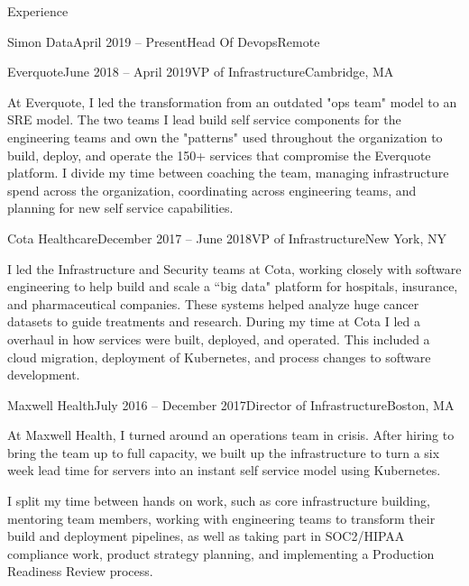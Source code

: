 \documentclass{resume} %
\begin{document}
\begin{rSection}{Experience}
\begin{rSubsection}{Simon Data}{April 2019 -- Present}{Head Of Devops}{Remote}
\end{rSubsection}

\begin{rSubsection}{Everquote}{June 2018 -- April 2019}{VP of Infrastructure}{Cambridge, MA}

\item[] At Everquote, I led the transformation from an outdated "ops team" model to an
  SRE model.  The two teams I lead build self service components for the engineering
  teams and own the "patterns" used throughout the organization to build, deploy, and
  operate the 150+ services that compromise the Everquote platform.  I divide my time
  between coaching the team, managing infrastructure spend across the
  organization, coordinating across engineering teams, and planning for new
  self service capabilities.

\end{rSubsection}

\begin{rSubsection}{Cota Healthcare}{December 2017 -- June 2018}{VP of Infrastructure}{New York, NY}
\item[] I led the Infrastructure and Security teams at Cota, working closely with
  software engineering to help build and scale a ``big data" platform for hospitals,
  insurance, and pharmaceutical companies.  These systems helped analyze huge cancer
  datasets to guide treatments and research.  During my time at Cota I led a overhaul
  in how services were built, deployed, and operated.  This included a cloud migration,
  deployment of Kubernetes, and process changes to software development.

\end{rSubsection}

\begin{rSubsection}{Maxwell Health}{July 2016 -- December 2017}{Director of Infrastructure}{Boston, MA}

\item[] At Maxwell Health, I turned around an operations team in crisis.  After
  hiring to bring the team up to full capacity, we built up the infrastructure
  to turn a six week lead time for servers into an instant self service model
  using Kubernetes.

I split my time between hands on work, such as core infrastructure building,
  mentoring team members, working with engineering teams to transform their
  build and deployment pipelines, as well as taking part in SOC2/HIPAA
  compliance work, product strategy planning, and implementing a Production
  Readiness Review process.


\end{rSubsection}
\end{rSection}
\end{document}
